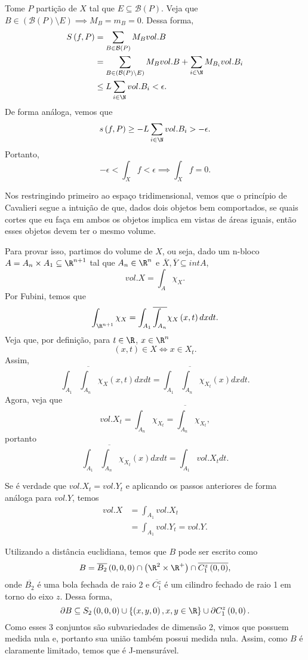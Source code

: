 \documentclass[a4paper]{report}
\begin{document}
Tome $P$ partição de $X$ tal que $E\subseteq\mathcal{B}\left( P \right) $. Veja que $B\in \left(  \mathcal{B}\left( P \right) \setminus E\right) \implies M_B = m_B = 0 $. Dessa forma,
\begin{align*}
    S\left( f, P \right) &= \sum_{B\in \mathcal{B}\left( P \right) } M_B vol. B \\
    &= \sum_{B\in \left( \mathcal{B}\left( P \right) \setminus E \right) } M_B vol. B + \sum_{i\in \N} M_{B_i} vol.B_i \\
    &\le L \sum_{i\in \N} vol. B_i < \epsilon
.\end{align*}
De forma análoga, vemos que \[
s\left( f,P \right) \ge  -L \sum_{i\in \N} vol. B_i > -\epsilon
.\] Portanto, \[
-\epsilon < \int_X f < \epsilon \implies \int_X f = 0
.\] 


Nos restringindo primeiro ao espaço tridimensional, vemos que o princípio de Cavalieri segue a intuição de que, dados dois objetos bem comportados, se quais cortes que eu faça em ambos os objetos implica em vistas de áreas iguais, então esses objetos devem ter o mesmo volume.

Para provar isso, partimos do volume de $X$, ou seja, dado um n-bloco $A = A_n\times A_1 \subseteq\R^{n+1}$ tal que $A_n\in \R^{n}$ e $\overline{X},\overline{Y} \subseteq int A$, \[
vol. X = \int_{A} \chi_X
.\] Por Fubini, temos que \[
\int_{\R^{n+1}} \chi_X = \int_{A_1} \overline{\int_{A_n}} \chi_X\left( x, t \right) dx dt
.\] Veja que, por definição, para $t\in \R$, $x\in \R^{n}$ \[
\left( x,t \right) \in X \iff x \in X_t
.\] Assim, \[
\int_{A_1} \overline{\int_{A_n}} \chi_X\left( x, t \right) dx dt = \int_{A_1}\overline{\int_{A_n}} \chi_{X_t} \left( x \right) dx dt
.\] Agora, veja que \[
vol. X_t = \int_{A_n} \chi_{X_t} = \overline{\int_{A_n}} \chi_{X_t}
,\] portanto \[
\int_{A_1}\overline{\int_{A_n}} \chi_{X_t} \left( x \right) dx dt = \int_{A_1} vol. X_t dt
.\]

Se é verdade que $vol. X_t = vol. Y_t$ e aplicando os passos anteriores de forma análoga para $vol. Y$, temos
\begin{align*}
    vol. X &= \int_{A_1} vol. X_t \\
    &= \int_{A_1} vol. Y_t = vol. Y
.\end{align*}



Utilizando a distância euclidiana, temos que $B$ pode ser escrito como \[
B = \overline{B_2}\left( 0,0,0 \right) \cap \left( \R^{2}\times \R^{+} \right) \cap \overline{C_1^{z}\left( 0,0 \right) }
,\] onde $\overline{B_2}$ é uma bola fechada de raio 2 e $\overline{C_1^{z}}$ é um cilindro fechado de raio 1 em torno do eixo $z$. Dessa forma, \[
\partial B \subseteq S_2\left( 0,0,0 \right) \cup \left\{ \left( x,y,0 \right) , x,y\in \R \right\} \cup \partial C_1^{z}\left( 0,0 \right) 
.\] Como esses 3 conjuntos são subvariedades de dimensão 2, vimos que possuem medida nula e, portanto sua união também possui medida nula. Assim, como $B$ é claramente limitado, temos que é J-mensurável.
\end{document}

